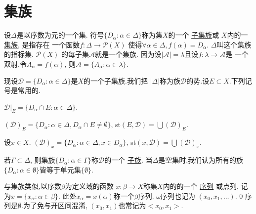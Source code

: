 \documentclass[main.tex]{subfiles}
\begin{document}
\section{集族}\label{sec:1.1}

设$\Delta$是以序数为元的一个集.
符号$\{D_\alpha : \alpha\in\Delta\}$称为集$X$的一个
\underline{子集族}或
$X$内的一\underline{集族}, 是指存在
一个函数$f:\Delta \to \mathscr{P}(X)$
使得$\forall \alpha \in \Delta, f(\alpha)=D_\alpha$.
$\Delta$叫这个集族的指标集. $\mathscr{P}(X)$
的每子集$\mathscr{A}$就是一个集族.
因为设$|\mathscr{A}|=\lambda$且设$f: \lambda\to \mathscr{A}$是
一个双射.令$A_\alpha = f(\alpha)$, 则$\mathscr{A}=\{A_\alpha:\alpha\in\lambda\}$.

现设$\mathscr{D}=\{D_\alpha:\alpha\in\Delta\}$是$X$的一个子集族.我们把
$|\Delta|$称为族$\mathscr{D}$的势.设$E\subset X$.下列记号是常用的.

$\mathscr{D}|_E= \{D_\alpha\cap E: \alpha\in\Delta\}$.

$(\mathscr{D})_E= \{D_\alpha: \alpha\in\Delta, D_\alpha\cap E \ne\emptyset\}$,
st$(E, \mathscr{D}) = \bigcup(\mathscr{D})_E$.

设$x\in X$. $(\mathscr{D})_x= \{D_\alpha: \alpha\in\Delta, x\in D_\alpha\}$,
st$(x, \mathscr{D}) = \bigcup(\mathscr{D})_x$.

若$\Gamma\subset\Delta$, 则集族$\{D_\alpha : \alpha\in\Gamma\}$称$\mathscr{D}$的一个
\underline{子族}.
当$\Delta$是空集时,我们认为所有的族$\{D_\alpha : \alpha\in\emptyset\}$皆等于单元集$\{\emptyset\}$.

与集族类似,以序数$\beta$为定义域的函数
$x: \beta\to X$称集$X$内的的一个
\underline{序列}
或点列, 记为$x=\{x_\alpha : \alpha\in\beta\}$.
此处$x_\alpha=x(\alpha)$称一个$\beta$序列. $\omega$序列也记为
$(x_0, x_1, \dots)$. 0 序列是$\emptyset$.为了免与开区间混淆, $(x_0, x_1)$也常记为$<x_0, x_1>$.

\end{document}
